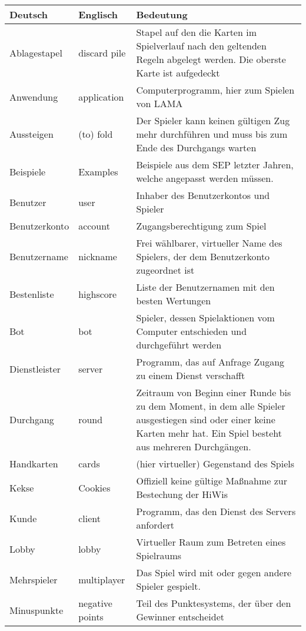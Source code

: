\begin{center}
		\begin{longtable}{p{} p{} p{}}
			\textbf{Deutsch} & \textbf{Englisch} & \textbf{Bedeutung} \\
			\hline \hline \endhead
			Ablagestapel & discard pile & Stapel auf den die Karten im Spielverlauf nach den geltenden Regeln abgelegt werden. Die oberste Karte ist aufgedeckt\\
			Anwendung & application & Computerprogramm, hier zum Spielen von LAMA\\
			Aussteigen & (to) fold & Der Spieler kann keinen gültigen Zug mehr durchführen und muss bis zum Ende des Durchgangs warten\\
			Beispiele & Examples & Beispiele aus dem SEP letzter Jahren, welche angepasst werden müssen.\\ 
			Benutzer & user & Inhaber des Benutzerkontos und Spieler\\
			Benutzerkonto & account & Zugangsberechtigung zum Spiel\\
			Benutzername & nickname & Frei wählbarer, virtueller Name des Spielers, der dem Benutzerkonto zugeordnet ist\\
			Bestenliste & highscore & Liste der Benutzernamen mit den besten Wertungen\\
			Bot & bot & Spieler, dessen Spielaktionen vom Computer entschieden und durchgeführt werden\\
			Dienstleister & server & Programm, das auf Anfrage Zugang zu einem Dienst verschafft \\
			Durchgang & round & Zeitraum von Beginn einer Runde bis zu dem Moment, in dem alle Spieler ausgestiegen sind oder einer keine Karten mehr hat.
			Ein Spiel besteht aus mehreren Durchgängen.\\
			Handkarten & cards & (hier virtueller) Gegenstand des Spiels\\
			Kekse & Cookies & Offiziell keine gültige Maßnahme zur Bestechung der HiWis\\ 
			Kunde & client & Programm, das den Dienst des Servers anfordert\\
 			Lobby & lobby & Virtueller Raum zum Betreten eines Spielraums\\	
 			Mehrspieler & multiplayer & Das Spiel wird mit oder gegen andere Spieler gespielt.\\
 			Minuspunkte & negative points & Teil des Punktesystems, der über den Gewinner entscheidet\\

\end{longtable}
\end{center}
